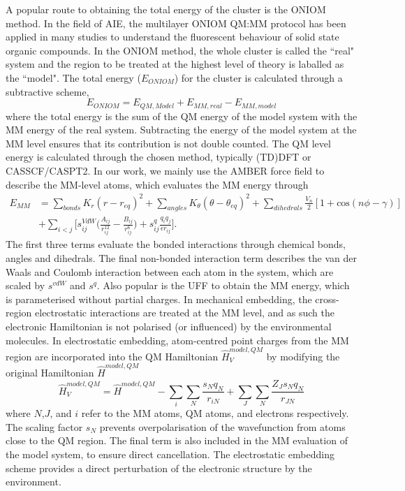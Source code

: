 A popular route to obtaining the total energy of the cluster is the ONIOM method.\cite{Byun1999,Frisch2003,Chung2015a} In the field of \ac{AIE}, the multilayer ONIOM QM:MM protocol has been applied in many studies to understand the fluorescent behaviour of solid state organic compounds.\cite{Li2011,Li2013,Sun2015a,Presti2016a,Wilbraham2016,Wang2016,Peng2016,Fan2016,Presti2017a,Li2017b,Lin2017,Li2017e,Fan2017,Hestand2017} In the ONIOM method, the whole cluster is called the ``real" system and the region to be treated at the highest level of theory is laballed as the ``model". The total energy ($E_{ONIOM}$) for the cluster is calculated through a subtractive scheme,
\begin{equation}\label{equation: ONIOM}
E_{ONIOM}=E_{QM,Model}+E_{MM,real}-E_{MM,model}
\end{equation}
where the total energy is the sum of the QM energy of the model system with the MM energy of the real system. Subtracting the energy of the model system at the MM level ensures that its contribution is not double counted.\cite{Chung2015a} The QM level energy is calculated through the chosen method, typically (TD)DFT or CASSCF/CASPT2. In our work, we mainly use the AMBER force field to describe the MM-level atoms, which evaluates the MM energy through\cite{Case2005}
\begin{equation}
\begin{split}
    E_{MM}&=\sum_{bonds}K_{r}(r-r_{eq})^{2}+\sum_{angles}K_{\theta}(\theta-\theta_{eq})^{2}+\sum_{dihedrals}\frac{V_{n}}{2}[1+\mathrm{cos}(n\phi{}-\gamma{})]\\
    &+\sum_{i<j}\bigg[s_{ij}^{VdW}\big(\frac{A_{ij}}{r_{ij}^{12}}-\frac{B_{ij}}{r_{ij}^{6}}\big)+s^{q}_{ij}\frac{q_{i}q_{j}}{\epsilon{}r_{ij}}\bigg].
\end{split}
\end{equation}
The first three terms evaluate the bonded interactions through chemical bonds, angles and dihedrals. The final non-bonded interaction term describes the van der Waals and Coulomb interaction between each atom in the system, which are scaled by $s^{vdW}$ and $s^{q}$.
Also popular is the \ac{UFF} to obtain the MM energy, which is parameterised without partial charges.\cite{Rappe2007} In mechanical embedding, the cross-region electrostatic interactions are treated at the MM level, and as such the electronic Hamiltonian is not polarised (or influenced) by the environmental molecules. In electrostatic embedding, atom-centred point charges from the MM region are incorporated into the QM Hamiltonian $\hat{H}_{V}^{model,QM}$ by modifying the original Hamiltonian $\hat{H}^{model,QM}$
\begin{equation}
    \hat{H}_{V}^{model,QM}=\hat{H}^{model,QM}-\sum_{i}\sum_{N}\frac{s_{N}q_{N}}{r_{iN}}+\sum_{J}\sum_{N}\frac{Z_{J}s_{N}q_{N}}{r_{JN}}
\end{equation}
where $N$,$J$, and $i$ refer to the MM atoms, QM atoms, and electrons respectively.\cite{Vreven2006} The scaling factor $s_{N}$ prevents overpolarisation of the wavefunction from atoms close to the QM region. The final term is also included in the MM evaluation of the model system, to ensure direct cancellation. The electrostatic embedding scheme provides a direct perturbation of the electronic structure by the environment. 


